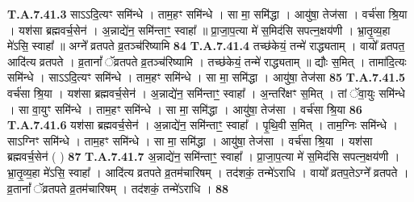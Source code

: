 \documentclass[17pt]{extarticle}
\begin{document}
{                  \newline
                                                                  \textbf{ T.A.7.41.3} \newline
                  साऽऽदि॒त्यꣳ समि॑न्धे । ताम॒हꣳ समि॑न्धे । सा मा॒ समि॑द्धा । आयु॑षा॒ तेज॑सा । वर्च॑सा श्रि॒या । यश॑सा ब्रह्मवर्च॒सेन॑ । अ॒न्नाद्ये॑न॒ समि॑न्ताꣳ॒॒ स्वाहा᳚ ॥ प्रा॒जा॒प॒त्या मे॑ स॒मिद॑सि सपत्न॒क्षय॑णी ।  भ्रा॒तृ॒व्य॒हा मे॑ऽसि॒ स्वाहा᳚ ॥ अग्ने᳚ व्रतपते व्र॒तञ्च॑रिष्यामि \textbf{ 84} \newline
                  \newline
                                                                  \textbf{ T.A.7.41.4} \newline
                  तच्छ॑केयं॒ तन्मे॑ राद्ध्यताम् । वायो᳚ व्रतपत॒ आदि॑त्य व्रतपते । व्र॒तानां᳚ ॅव्रतपते व्र॒तञ्च॑रिष्यामि । तच्छ॑केयं॒ तन्मे॑ राद्ध्यताम् ॥ द्यौः स॒मित् । तामा॑दि॒त्यः समि॑न्धे । साऽऽदि॒त्यꣳ समि॑न्धे ।  ताम॒हꣳ समि॑न्धे । सा मा॒ समि॑द्धा । आयु॑षा॒ तेज॑सा \textbf{ 85} \newline
                  \newline
                                                                  \textbf{ T.A.7.41.5} \newline
                  वर्च॑सा श्रि॒या । यश॑सा ब्रह्मवर्च॒सेन॑ । अ॒न्नाद्ये॑न॒ समि॑न्ताꣳ॒॒ स्वाहा᳚ ।  अ॒न्तरि॑क्षꣳ स॒मित् । तां ॅवा॒युः समि॑न्धे । सा वा॒युꣳ समि॑न्धे । ताम॒हꣳ समि॑न्धे । सा मा॒ समि॑द्धा । आयु॑षा॒ तेज॑सा । वर्च॑सा श्रि॒या \textbf{ 86} \newline
                  \newline
                                                                  \textbf{ T.A.7.41.6} \newline
                  यश॑सा ब्रह्मवर्च॒सेन॑ । अ॒न्नाद्ये॑न॒ समि॑न्ताꣳ॒॒ स्वाहा᳚ । पृ॒थि॒वी स॒मित् । ताम॒ग्निः समि॑न्धे । साऽग्निꣳ समि॑न्धे । ताम॒हꣳ समि॑न्धे ।  सा मा॒ समि॑द्धा । आयु॑षा॒ तेज॑सा । वर्च॑सा श्रि॒या ।  यश॑सा ब्रह्मवर्च॒सेन॑ ( ) \textbf{ 87} \newline
                  \newline
                                                                  \textbf{ T.A.7.41.7} \newline
                  अ॒न्नाद्ये॑न॒ समि॑न्ताꣳ॒॒ स्वाहा᳚ । प्रा॒जा॒प॒त्या मे॑ स॒मिद॑सि सपत्न॒क्षय॑णी । भ्रा॒तृ॒व्य॒हा मे॑ऽसि॒ स्वाहा᳚ । आदि॑त्य व्रतपते व्र॒तम॑चारिषम् ।  तद॑शकं॒ तन्मे॑ऽराधि । वायो᳚ व्रतप॒तेऽग्ने᳚ व्रतपते । व्र॒तानां᳚ ॅव्रतपते व्र॒तम॑चारिषम् । तद॑शकं॒ तन्मे॑ऽराधि । \textbf{ 88} \newline
}
\end{document}
